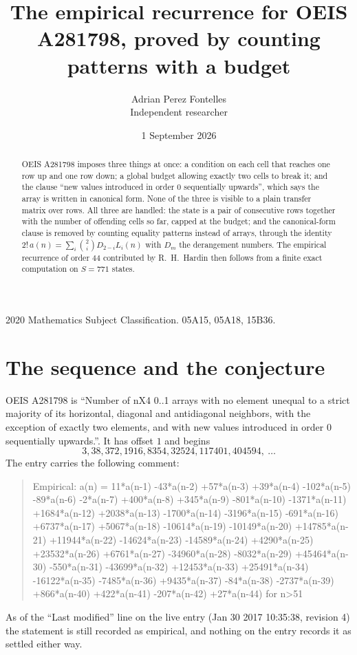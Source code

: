 \documentclass[11pt,a4paper]{article}
\title{The empirical recurrence for OEIS A281798, proved by counting patterns with a budget}
\author{Adrian Perez Fontelles\\ \small Independent researcher}
\date{1 September 2026}
\theoremstyle{plain}
\theoremstyle{definition}
\begin{document}
\maketitle

\begin{abstract}
OEIS A281798 imposes three things at once: a condition on each cell that reaches one row up and
one row down; a global budget allowing exactly two cells to
break it; and the clause ``new values introduced in order $0$ sequentially upwards'', which
says the array is written in canonical form. None of the three is visible to a plain transfer
matrix over rows. All three are handled: the state is a pair of consecutive rows
together with the number of offending cells so far, capped at the budget; and the
canonical-form clause is removed by counting equality patterns instead of arrays, through the
identity $2!\,a(n)=\sum_i\binom{2}{i}D_{2-i}L_i(n)$ with $D_m$ the derangement
numbers. The empirical recurrence of order $44$ contributed by R.~H.~Hardin then follows
from a finite exact computation on $S=771$ states.
\end{abstract}

\noindent\small 2020 Mathematics Subject Classification. 05A15, 05A18, 15B36.\normalsize

\section{The sequence and the conjecture}

OEIS A281798 is ``Number of nX4 0..1 arrays with no element unequal to a strict majority of its horizontal, diagonal and antidiagonal neighbors, with the exception of exactly two elements, and with new values introduced in order 0 sequentially upwards.''. It has offset $1$ and begins
\[
3, 38, 372, 1916, 8354, 32524, 117401, 404594,\ \dots
\]
The entry carries the following comment:
\begin{quote}\small
Empirical: a(n) = 11*a(n-1) -43*a(n-2) +57*a(n-3) +39*a(n-4) -102*a(n-5) -89*a(n-6) -2*a(n-7) +400*a(n-8) +345*a(n-9) -801*a(n-10) -1371*a(n-11) +1684*a(n-12) +2038*a(n-13) -1700*a(n-14) -3196*a(n-15) -691*a(n-16) +6737*a(n-17) +5067*a(n-18) -10614*a(n-19) -10149*a(n-20) +14785*a(n-21) +11944*a(n-22) -14624*a(n-23) -14589*a(n-24) +4290*a(n-25) +23532*a(n-26) +6761*a(n-27) -34960*a(n-28) -8032*a(n-29) +45464*a(n-30) -550*a(n-31) -43699*a(n-32) +12453*a(n-33) +25491*a(n-34) -16122*a(n-35) -7485*a(n-36) +9435*a(n-37) -84*a(n-38) -2737*a(n-39) +866*a(n-40) +422*a(n-41) -207*a(n-42) +27*a(n-44) for n>51
\end{quote}
As of the ``Last modified'' line on the live entry (Jan 30 2017 10:35:38, revision 4) the statement is
still recorded as empirical, and nothing on the entry records it as settled either way.
\end{document}
